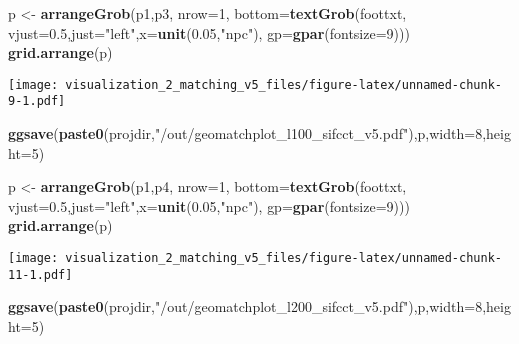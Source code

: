 \documentclass[
]{article}
\newenvironment{Shaded}{\begin{snugshade}}{\end{snugshade}}
\newcommand{\DataTypeTok}[1]{\textcolor[rgb]{0.13,0.29,0.53}{#1}}
\newcommand{\DecValTok}[1]{\textcolor[rgb]{0.00,0.00,0.81}{#1}}
\newcommand{\FloatTok}[1]{\textcolor[rgb]{0.00,0.00,0.81}{#1}}
\newcommand{\KeywordTok}[1]{\textcolor[rgb]{0.13,0.29,0.53}{\textbf{#1}}}
\newcommand{\NormalTok}[1]{#1}
\newcommand{\StringTok}[1]{\textcolor[rgb]{0.31,0.60,0.02}{#1}}
\begin{document}
\begin{Shaded}
\begin{Highlighting}[]
\NormalTok{p <-}\StringTok{ }\KeywordTok{arrangeGrob}\NormalTok{(p1,p3, }\DataTypeTok{nrow=}\DecValTok{1}\NormalTok{,}
                 \DataTypeTok{bottom=}\KeywordTok{textGrob}\NormalTok{(foottxt,}
                                 \DataTypeTok{vjust=}\FloatTok{0.5}\NormalTok{,}\DataTypeTok{just=}\StringTok{"left"}\NormalTok{,}\DataTypeTok{x=}\KeywordTok{unit}\NormalTok{(}\FloatTok{0.05}\NormalTok{,}\StringTok{"npc"}\NormalTok{),}
                                 \DataTypeTok{gp=}\KeywordTok{gpar}\NormalTok{(}\DataTypeTok{fontsize=}\DecValTok{9}\NormalTok{)))}
\KeywordTok{grid.arrange}\NormalTok{(p)}
\end{Highlighting}
\end{Shaded}

\texttt{[image: visualization\_2\_matching\_v5\_files/figure-latex/unnamed-chunk-9-1.pdf]}

\begin{Shaded}
\begin{Highlighting}[]
\KeywordTok{ggsave}\NormalTok{(}\KeywordTok{paste0}\NormalTok{(projdir,}\StringTok{"/out/geomatchplot_l100_sifcct_v5.pdf"}\NormalTok{),p,}\DataTypeTok{width=}\DecValTok{8}\NormalTok{,}\DataTypeTok{height=}\DecValTok{5}\NormalTok{)}
\end{Highlighting}
\end{Shaded}

\begin{Shaded}
\begin{Highlighting}[]
\NormalTok{p <-}\StringTok{ }\KeywordTok{arrangeGrob}\NormalTok{(p1,p4, }\DataTypeTok{nrow=}\DecValTok{1}\NormalTok{,}
                 \DataTypeTok{bottom=}\KeywordTok{textGrob}\NormalTok{(foottxt, }\DataTypeTok{vjust=}\FloatTok{0.5}\NormalTok{,}\DataTypeTok{just=}\StringTok{"left"}\NormalTok{,}\DataTypeTok{x=}\KeywordTok{unit}\NormalTok{(}\FloatTok{0.05}\NormalTok{,}\StringTok{"npc"}\NormalTok{),}
                                 \DataTypeTok{gp=}\KeywordTok{gpar}\NormalTok{(}\DataTypeTok{fontsize=}\DecValTok{9}\NormalTok{)))}
\KeywordTok{grid.arrange}\NormalTok{(p)}
\end{Highlighting}
\end{Shaded}

\texttt{[image: visualization\_2\_matching\_v5\_files/figure-latex/unnamed-chunk-11-1.pdf]}

\begin{Shaded}
\begin{Highlighting}[]
\KeywordTok{ggsave}\NormalTok{(}\KeywordTok{paste0}\NormalTok{(projdir,}\StringTok{"/out/geomatchplot_l200_sifcct_v5.pdf"}\NormalTok{),p,}\DataTypeTok{width=}\DecValTok{8}\NormalTok{,}\DataTypeTok{height=}\DecValTok{5}\NormalTok{)}
\end{Highlighting}
\end{Shaded}
\end{document}
